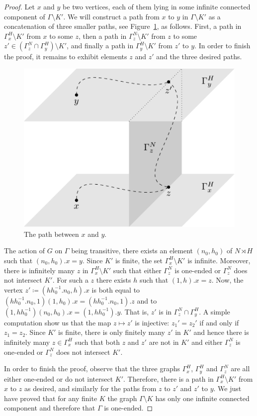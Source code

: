 \documentclass[a4paper]{article}
\theoremstyle{definition}
\theoremstyle{remark}%
\begin{document}
\begin{proof}
Let $x$ and $y$ be two vertices, each of them lying in some infinite connected component of $\Gamma\setminus K'$.
We will construct a path from $x$ to $y$ in $\Gamma\setminus K'$ as a concatenation of three smaller paths, see Figure~\ref{Figure:PathSemiDirect}, as follows.
First, a path in $\Gamma_x^H\setminus K'$ from $x$ to some $z$, then a path in $\Gamma_z^N\setminus K'$ from $z$ to some $z'\in (\Gamma_z^N\cap \Gamma_y^H)\setminus K'$, and finally a path in $\Gamma_y^H\setminus K'$ from $z'$ to $y$.
In order to finish the proof, it remains to exhibit elements $z$ and $z'$ and the three desired paths.
%
%
\begin{figure}[htbp]\centering
\includegraphics{SemiDirect}
\caption{The path between $x$ and $y$.}
\label{Figure:PathSemiDirect}
\end{figure}
%
%

The action of $G$ on $\Gamma$ being transitive, there exists an element $(n_0,h_0)$ of $N \rtimes H$ such that $(n_0,h_0).x = y$.
Since $K'$ is finite, the set $\Gamma_x^H\setminus K'$ is infinite.
Moreover, there is infinitely many $z$ in $\Gamma_x^H\setminus K'$ such that either $\Gamma_z^N$ is one-ended or $\Gamma_z^N$ does not intersect $K'$.
For such a $z$ there exists $h$ such that $(1,h).x=z$.
Now, the vertex $z'\coloneqq(hh_0^{-1}.n_0,h).x$ is both equal to $(hh_0^{-1}.n_0,1)(1,h_0).x=(hh_0^{-1}.n_0,1).z$ and to $(1,hh_0^{-1})(n_0,h_0).x=(1,hh_0^{-1}).y$. That is, $z'$ is in $\Gamma_z^N\cap \Gamma_y^H$.
A simple computation show us that the map $z\mapsto z'$ is injective: $z_1'=z_2'$ if and only if $z_1=z_2$.
Since $K'$ is finite, there is only finitely many $z'$ in $K'$ and hence there is infinitely many $z\in \Gamma_x^H$ such that both $z$ and $z'$ are not in $K'$ and either $\Gamma_z^N$ is one-ended or $\Gamma_z^N$ does not intersect $K'$.

In order to finish the proof, observe that the three graphs $\Gamma_x^H$, $\Gamma_y^H$ and $\Gamma_z^N$ are all either one-ended or do not intersect $K'$.
Therefore, there is a path in $\Gamma_x^H\setminus K'$ from $x$ to $z$ as desired, and similarly for the paths from $z$ to $z'$ and $z'$ to $y$.
We just have proved that for any finite $K$ the graph $\Gamma\setminus K$ has only one infinite connected component and therefore that $\Gamma$ is one-ended.
\end{proof}
\end{document}
